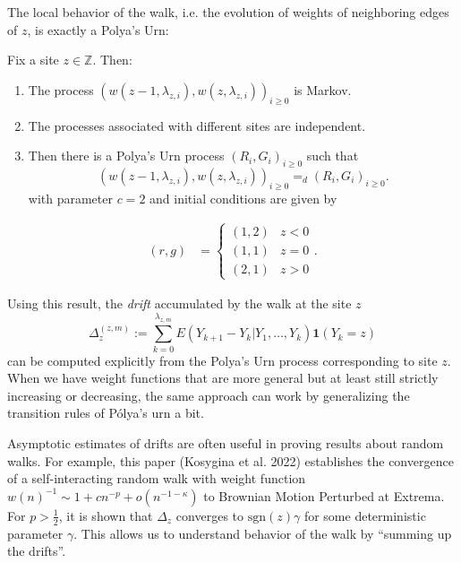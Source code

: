 The local behavior of the walk, i.e. the evolution of weights of neighboring edges of $z$, is exactly a Polya's Urn:

\begin{proposition}
	Fix a site $z \in \mathbb{Z}$. Then:
	\begin{enumerate}
		\item 
			The process $\left(w(z-1, \lambda_{z, i}), w(z, \lambda_{z, i})\right)_{i \ge 0}$ is Markov.
		\item The processes associated with different sites are independent.

		\item 
	Then there is a Polya's Urn process $(R_i, G_i)_{i \ge 0}$ such that
	\[
		\left(w(z-1, \lambda_{z, i}), w(z, \lambda_{z, i})\right)_{i \ge 0}
		=_d
		\left( R_i, G_i \right) _{i \ge 0}
	.\]
	with parameter $c = 2$ and initial conditions are given by
	\end{enumerate}
	\begin{align*}
		(r, g) &= \begin{cases}
			(1,2) & z < 0\\
			(1,1) & z = 0\\
			(2,1) & z > 0
		\end{cases}
	.\end{align*}
\end{proposition}

\begin{remark}
	
Using this result, the \textit{drift} accumulated by the walk at the site $z$ 
\[
	\Delta_z^{(z, m)} := \sum_{k = 0}^{\lambda_{z, m}} E\left( Y_{k + 1} - Y_k | Y_1, \ldots, Y_k \right) \mathbf{1}\left( Y_k = z \right) 
\] 
can be computed explicitly from the Polya's Urn process corresponding to site $z$. When we have weight functions that are more general but at least still strictly increasing or decreasing, the same approach can work by generalizing the transition rules of P\'olya's urn a bit.

Asymptotic estimates of drifts are often useful in proving results about random walks. For example, this paper (Kosygina et al. 2022) establishes the convergence of a self-interacting random walk with weight function $w(n)^{-1} \sim  1 + c n^{-p} + o(n^{- 1 - \kappa})$ to Brownian Motion Perturbed at Extrema. For $p > \frac{1}{2}$, it is shown that $\Delta_z$ converges to $\text{sgn}(z) \gamma$ for some deterministic parameter $\gamma$. This allows us to understand behavior of the walk by ``summing up the drifts''.



\end{remark}

